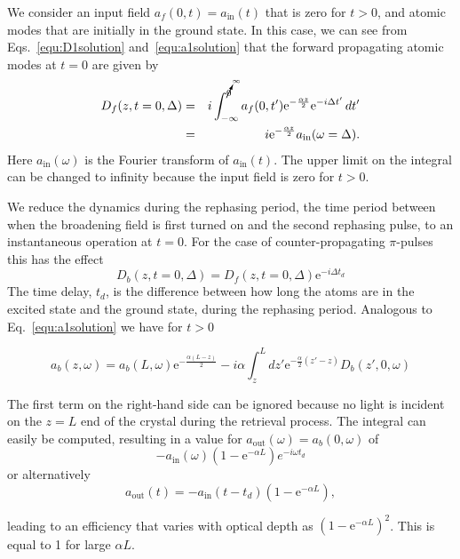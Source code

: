 \documentclass[superscriptaddress,pra,twocolumn,showpacs,amsmath,amssymb,aps,a4paper]{revtex4}
\begin{document}
We consider an input field $a_f(0,t) = a_\text{in}(t)$ that is zero for $t>0$, and atomic modes that are initially in the ground state.
In this case, we can see from Eqs.~\ref{equ:D1solution} and~\ref{equ:a1solution} that the forward propagating atomic modes at $t=0$ are given by
\begin{eqnarray}
  \label{eq:jevon1}
  D_f(z,t=0,\Delta) &=& i \int_{-\infty}^{\cancelto{\infty}{0}}a_f(0,t')\text{e}^{-\frac{\alpha z}{2}}\text{e}^{-i\Delta t'}\,dt'\nonumber\\
  &=&i\text{e}^{-\frac{\alpha z}{2}} a_\text{in}(\omega=\Delta).
\end{eqnarray}
Here $a_\text{in}(\omega)$ is the Fourier transform of $a_\text{in}(t)$. The upper limit on the integral can be changed to infinity because the input field is zero for $t>0$.

We reduce the dynamics during the rephasing period, the time period between when the broadening field is first turned on and the second rephasing pulse, to an instantaneous operation at $t=0$. For the case of counter-propagating $\pi$-pulses this has the effect
\begin{equation}
  D_b(z,t=0,\Delta) = D_f(z,t=0,\Delta)\text{e}^{-i\Delta t_d}
\end{equation}
The time delay, $t_d$, is the difference between how long the atoms are in the excited state and the ground state, during the rephasing period. Analogous to Eq.~\ref{equ:a1solution} we have for $t>0$

\begin{equation}
{a}_b(z,\omega) = {a}_b(L,\omega)\text{e}^{-\frac{\alpha (L-z)}{2}} -
i\alpha \int^L_z dz' \text{e}^{-\frac{\alpha}{2}(z'-z)}D_b(z',0,\omega) 
\end{equation}

The first term on the right-hand side can be ignored because no light is incident on the $z=L$ end of the crystal during the retrieval process. The integral can easily be computed, resulting in a value for $a_\text{out}(\omega) = a_b(0,\omega)$ of 
\begin{equation}
 -a_\text{in}(\omega)\left(1-\text{e}^{-\alpha L}\right)e^{-i\omega t_d}
\end{equation}
or alternatively
\begin{equation}
a_\text{out}(t) =  -a_\text{in}(t-t_d)\left(1-\text{e}^{-\alpha L}\right),
\end{equation}

leading to an efficiency that varies with optical depth as $(1-\text{e}^{-\alpha L})^2$. This is equal to 1 for large $\alpha L$.
\end{document}
